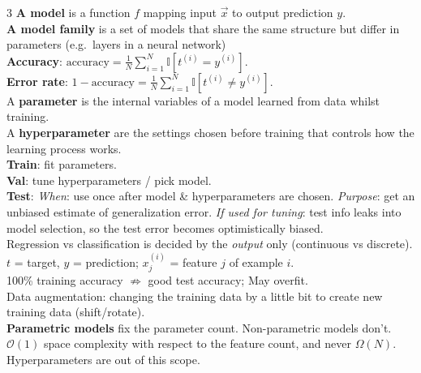 \documentclass[10pt]{article}
\newcommand{\ind}{\mathbb{I}}
\newcommand{\sub}[1]{\textit{#1}:}  %
\begin{document}
\begin{multicols*}{3}
\textbf{A model} is a function $f$ mapping input $\vec{x}$ to output prediction $y$.\\
\textbf{A model family} is a set of models that share the same structure but differ in parameters (e.g.\ layers in a neural network)\\
\textbf{Accuracy}: $\text{accuracy}=\frac{1}{N}\sum_{i=1}^N \ind\left[t^{(i)}=y^{(i)}\right]$.\\
\textbf{Error rate}: $1-\text{accuracy}=\frac{1}{N}\sum_{i=1}^N \ind\left[t^{(i)}\ne y^{(i)}\right]$.\\
A \textbf{parameter} is the internal variables of a model learned from data whilst training.\\
A \textbf{hyperparameter} are the settings chosen before training that controls how the learning process works.\\
\textbf{Train}: fit parameters.\\
\textbf{Val}: tune hyperparameters / pick model.\\
\textbf{Test}: \sub{When} use once after model \& hyperparameters are chosen. \sub{Purpose} get an unbiased estimate of generalization error. \sub{If used for tuning} test info leaks into model selection, so the test error becomes optimistically biased.\\
Regression vs classification is decided by the \emph{output} only (continuous vs discrete).\\
$t$ = target, $y$ = prediction; $x^{(i)}_j$ = feature $j$ of example $i$.\\
100\% training accuracy $\not\Rightarrow$ good test accuracy; May overfit.\\
Data augmentation: changing the training data by a little bit to create new training data (shift/rotate).\\
\textbf{Parametric models} fix the parameter count. Non-parametric models don't. $\mathcal{O}(1)$ space complexity with respect to the feature count, and never $\Omega(N)$. Hyperparameters are out of this scope.


\end{multicols*}
\end{document}
